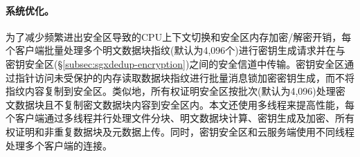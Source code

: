 \paragraph*{系统优化。}为了减少频繁进出安全区导致的CPU上下文切换和安全区内存加密/解密开销，每个客户端批量处理多个明文数据块指纹(默认为4,096个)进行密钥生成请求并在与密钥安全区(\S\ref{subsec:sgxdedup-encryption})之间的安全信道中传输。密钥安全区通过指针访问未受保护的内存读取数据块指纹进行批量消息锁加密密钥生成，而不将指纹内容复制到安全区\cite{harnik2018SGX}。类似地，所有权证明安全区按批次(默认为4,096)处理密文数据块且不复制密文数据块内容到安全区内。本文还使用多线程来提高性能，每个客户端通过多线程并行处理文件分块、明文数据块计算、密钥生成及加密、所有权证明和非重复数据块及元数据上传。同时，密钥安全区和云服务端使用不同线程处理多个客户端的连接。